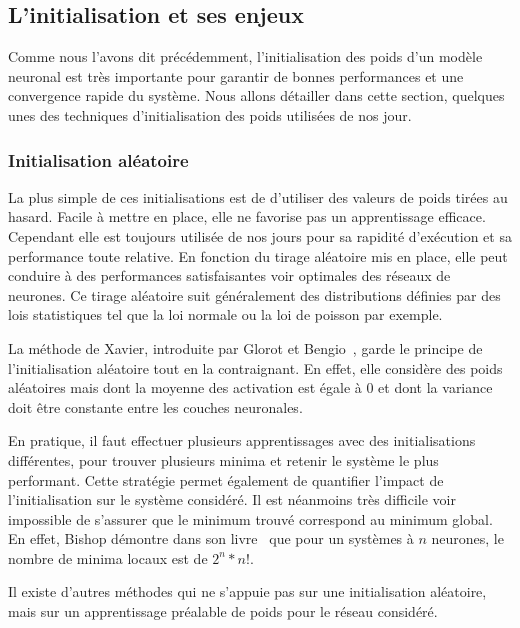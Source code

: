 \subsection{L'initialisation et ses enjeux}
Comme nous l'avons dit précédemment, l'initialisation des poids d'un modèle neuronal est très importante pour garantir de bonnes performances et une convergence rapide du système. Nous allons détailler dans cette section, quelques unes des techniques d'initialisation des poids utilisées de nos jour.


\subsubsection{Initialisation aléatoire}
La plus simple de ces initialisations est de d’utiliser des valeurs de poids tirées au hasard. Facile à mettre en place, elle ne favorise pas un apprentissage efficace. Cependant elle est toujours utilisée de nos jours pour sa rapidité d'exécution et sa performance toute relative. En fonction du tirage aléatoire mis en place, elle peut conduire à des performances satisfaisantes voir optimales des réseaux de neurones. Ce tirage aléatoire suit généralement des distributions définies par des lois statistiques tel que la loi normale ou la loi de poisson par exemple.

La méthode de Xavier, introduite par Glorot et Bengio~\cite{Glorot2010}, garde le principe de l'initialisation aléatoire tout en la contraignant. En effet, elle considère des poids aléatoires mais dont la moyenne des activation est égale à $0$ et dont la variance doit être constante entre les couches neuronales.

En pratique, il faut effectuer plusieurs apprentissages avec des initialisations différentes, pour trouver plusieurs minima et retenir le système le plus performant. Cette stratégie permet également de quantifier l'impact de l'initialisation sur le système considéré. Il est néanmoins très difficile voir impossible de s'assurer que le minimum trouvé correspond au minimum global. En effet, Bishop démontre dans son livre~\cite{Bishop2006} que pour un systèmes à $n$ neurones, le nombre de minima locaux est de $2^n*n!$.

Il existe d'autres méthodes qui ne s'appuie pas sur une initialisation aléatoire, mais sur un apprentissage préalable de poids pour le réseau considéré.

